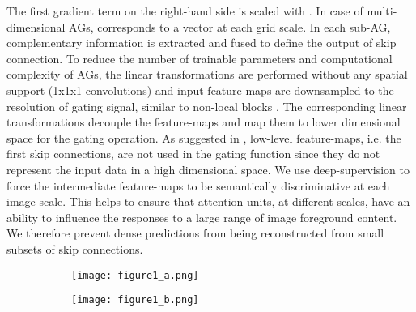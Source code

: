 \documentclass{article}
\begin{document}
The first gradient term on the right-hand side is scaled with . In case of multi-dimensional AGs,  corresponds to a vector at each grid scale. In each sub-AG, complementary information is extracted and fused to define the output of skip connection. To reduce the number of trainable parameters and computational complexity of AGs, the linear transformations are performed without any spatial support (1x1x1 convolutions) and input feature-maps are downsampled to the resolution of gating signal, similar to non-local blocks \cite{wang2017non}. The corresponding linear transformations decouple the feature-maps and map them to lower dimensional space for the gating operation. As suggested in \cite{jetley2018learn}, low-level feature-maps, i.e. the first skip connections, are not used in the gating function since they do not represent the input data in a high dimensional space. We use deep-supervision \cite{lee2015deeply} to force the intermediate feature-maps to be semantically discriminative at each image scale. This helps to ensure that attention units, at different scales, have an ability to influence the responses to a large range of image foreground content. We therefore prevent dense predictions from being reconstructed from small subsets of skip connections.

\begin{figure}[t]
	\centering
	\begin{subfigure}{0.628\linewidth}
		\centering
		\texttt{[image: figure1\_a.png]}
		\label{fig:attention_activations}
	\end{subfigure}
	\hfill
	\begin{subfigure}{0.360\linewidth}
		\centering
		\texttt{[image: figure1\_b.png]}
		\label{fig:qualitative_comparison}
	\end{subfigure}
\end{figure}
\end{document}
